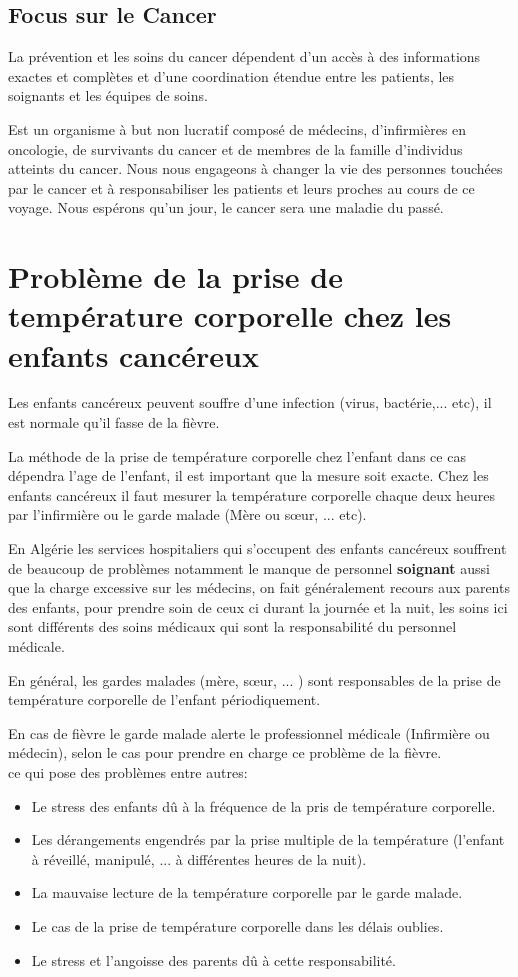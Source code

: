 \documentclass[12pt]{article}
\begin{document}
\subsection{Focus sur le Cancer}
La prévention et les soins du cancer dépendent d'un accès à des informations exactes et complètes et d'une coordination étendue entre les patients, les soignants et les équipes de soins.

Est un organisme à but non lucratif composé de médecins, d'infirmières en oncologie, de survivants du cancer et de membres de la famille d'individus atteints du cancer. Nous nous engageons à changer la vie des personnes touchées par le cancer et à responsabiliser les patients et leurs proches au cours de ce voyage. Nous espérons qu'un jour, le cancer sera une maladie du passé.

\section{Problème de la prise de température corporelle chez les enfants cancéreux}
Les enfants cancéreux peuvent souffre d'une infection (virus, bactérie,... etc), il est normale qu'il fasse de la fièvre.

La méthode de la prise de température corporelle chez l'enfant dans ce cas dépendra l’age de l’enfant, il est important que la mesure soit exacte. Chez les enfants cancéreux il faut mesurer la température corporelle chaque deux heures par l’infirmière ou le garde malade (Mère ou sœur, ... etc).

En Algérie les services hospitaliers qui s'occupent des enfants cancéreux souffrent de beaucoup de problèmes notamment le manque de personnel \textbf{soignant} aussi que la charge excessive sur les médecins, on fait généralement recours aux parents des enfants, pour prendre soin de ceux ci durant la journée et la nuit, les soins ici sont différents des soins médicaux qui sont la responsabilité du personnel médicale.

En général, les gardes malades (mère, sœur, ... ) sont responsables de la prise de température corporelle de l'enfant périodiquement.

En cas de fièvre le garde malade alerte le professionnel médicale (Infirmière ou médecin), selon le cas pour prendre en charge ce problème de la fièvre.\\
ce qui pose des problèmes entre autres: 
\begin{itemize}
	\item Le stress des enfants dû à  la fréquence de la pris de température corporelle.
	\item Les dérangements engendrés par la prise multiple de la température (l'enfant à réveillé, manipulé, ... à différentes heures de la nuit).
	\item La mauvaise lecture de la température corporelle par le garde malade.
	\item Le cas de la prise de température corporelle  dans les délais oublies.
	\item Le stress et l'angoisse des parents dû à cette responsabilité.
\end{itemize}
\end{document}

